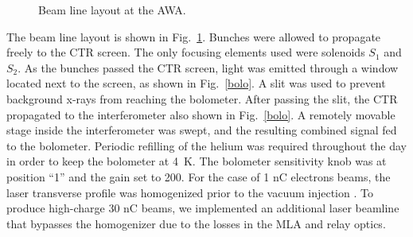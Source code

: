 \begin{figure}[hbt]
	\centering
	\begin{tikzpicture}[scale=0.8, text=black]
	
	\end{tikzpicture}	
	\caption{Beam line layout at the AWA.}
	\label{beamline}
\end{figure}
The beam line layout is shown in Fig.~\ref{beamline}. 
Bunches were allowed to propagate freely to the 
CTR screen. The only focusing elements used were solenoids $S_1$ and
$S_2$. As the bunches passed the CTR screen, light was
emitted through a window located next to the screen, 
as shown in Fig.~\ref{bolo}. A slit was used to prevent
background x-rays from reaching the bolometer.
After passing the slit, the CTR propagated to the 
interferometer also shown in Fig.~\ref{bolo}. 
A remotely movable stage inside the interferometer was swept, 
and the resulting combined signal fed to the bolometer. 
Periodic refilling of the helium was required throughout the day in order
to keep the bolometer at \SI{4}{K}. The bolometer sensitivity knob was at position ``1'' and
the gain set to 200.
For the case of 1 nC electrons beams, the laser transverse profile was homogenized prior to the vacuum injection \cite{PhysRevAccelBeams.20.103404}.
To produce high-charge 30 nC beams, we implemented an additional laser beamline that bypasses the homogenizer due to the losses in the 
MLA and relay optics.


